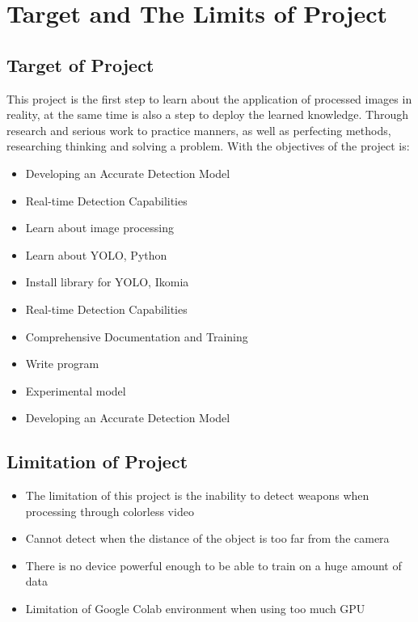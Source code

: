 \section{Target and The Limits of Project}
    \subsection{Target of Project}
    This project is the first step to learn about the application of processed images in reality, at the same time is also 
    a step to deploy the learned knowledge. Through research and serious work to practice manners, as well as perfecting 
    methods, researching thinking and solving a problem. With the objectives of the project is:
    \begin{itemize}
        \item Developing an Accurate Detection Model
        \item Real-time Detection Capabilities
        \item Learn about image processing
        \item Learn about YOLO, Python
        \item Install library for YOLO, Ikomia
        \item Real-time Detection Capabilities
        \item Comprehensive Documentation and Training
        \item Write program
        \item Experimental model
        \item Developing an Accurate Detection Model
    \end{itemize}
    \subsection{Limitation of Project}
    \begin{itemize}
        \item The limitation of this project is the inability to detect weapons when processing through colorless video
        \item Cannot detect when the distance of the object is too far from the camera
        \item There is no device powerful enough to be able to train on a huge amount of data
        \item Limitation of Google Colab environment when using too much GPU
    \end{itemize}

